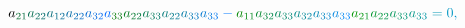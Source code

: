 \documentclass[12pt]{article}
\begin{document}
\begin{displaymath}
{a} _ { \mathcolor[RGB]{0,105,45}{2} \mathcolor[RGB]{0,105,60}{1} } \mathcolor[RGB]{0,105,75}{a} _ { \mathcolor[RGB]{0,105,90}{2} \mathcolor[RGB]{0,105,105}{2} } \mathcolor[RGB]{0,105,120}{a} _ { \mathcolor[RGB]{0,105,135}{1} \mathcolor[RGB]{0,105,150}{2} } \mathcolor[RGB]{0,105,165}{a} _ { \mathcolor[RGB]{0,105,180}{2} \mathcolor[RGB]{0,105,195}{2} } \mathcolor[RGB]{0,105,210}{a} _ { \mathcolor[RGB]{0,105,225}{3} \mathcolor[RGB]{0,105,240}{2} } \mathcolor[RGB]{0,105,255}{a} _ { \mathcolor[RGB]{0,120,0}{3} \mathcolor[RGB]{0,120,15}{3} } \mathcolor[RGB]{0,120,30}{a} _ { \mathcolor[RGB]{0,120,45}{2} \mathcolor[RGB]{0,120,60}{2} } \mathcolor[RGB]{0,120,75}{a} _ { \mathcolor[RGB]{0,120,90}{3} \mathcolor[RGB]{0,120,105}{3} } \mathcolor[RGB]{0,120,120}{a} _ { \mathcolor[RGB]{0,120,135}{2} \mathcolor[RGB]{0,120,150}{2} } \mathcolor[RGB]{0,120,165}{a} _ { \mathcolor[RGB]{0,120,180}{3} \mathcolor[RGB]{0,120,195}{3} } \mathcolor[RGB]{0,120,210}{a} _ { \mathcolor[RGB]{0,120,225}{3} \mathcolor[RGB]{0,120,240}{3} } \mathcolor[RGB]{0,120,255}{-} \mathcolor[RGB]{0,135,0}{a} _ { \mathcolor[RGB]{0,135,15}{1} \mathcolor[RGB]{0,135,30}{1} } \mathcolor[RGB]{0,135,45}{a} _ { \mathcolor[RGB]{0,135,60}{3} \mathcolor[RGB]{0,135,75}{2} } \mathcolor[RGB]{0,135,90}{a} _ { \mathcolor[RGB]{0,135,105}{3} \mathcolor[RGB]{0,135,120}{3} } \mathcolor[RGB]{0,135,135}{a} _ { \mathcolor[RGB]{0,135,150}{3} \mathcolor[RGB]{0,135,165}{2} } \mathcolor[RGB]{0,135,180}{a} _ { \mathcolor[RGB]{0,135,195}{3} \mathcolor[RGB]{0,135,210}{3} } \mathcolor[RGB]{0,135,225}{a} _ { \mathcolor[RGB]{0,135,240}{3} \mathcolor[RGB]{0,135,255}{3} } \mathcolor[RGB]{0,150,0}{a} _ { \mathcolor[RGB]{0,150,15}{2} \mathcolor[RGB]{0,150,30}{1} } \mathcolor[RGB]{0,150,45}{a} _ { \mathcolor[RGB]{0,150,60}{2} \mathcolor[RGB]{0,150,75}{2} } \mathcolor[RGB]{0,150,90}{a} _ { \mathcolor[RGB]{0,150,105}{3} \mathcolor[RGB]{0,150,120}{3} } \mathcolor[RGB]{0,150,135}{a} _ { \mathcolor[RGB]{0,150,150}{3} \mathcolor[RGB]{0,150,165}{3} } \mathcolor[RGB]{0,150,180}{=} \mathcolor[RGB]{0,150,195}{0} \mathcolor[RGB]{0,150,210}{,} \mathcolor[RGB]{0,150,225}{\,
}
\end{displaymath}
\end{document}
